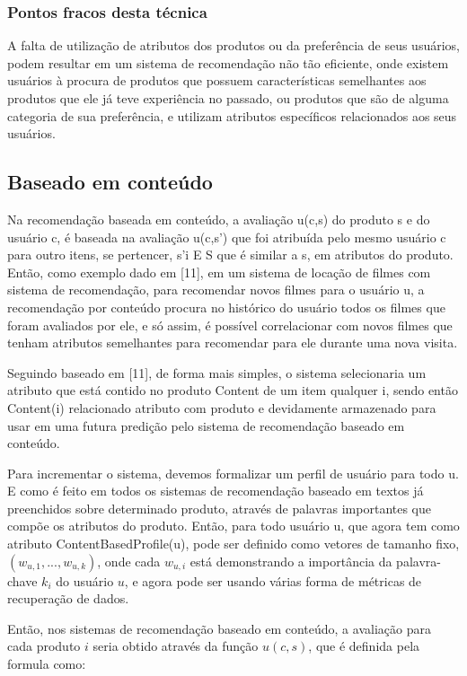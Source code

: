 \documentclass[12pt,
				openright,
				twoside,
				a4paper,
				apter=TITLE,
				section=TITLE,
				subsection=TITLE,
				chapter=TITLE,
				english,
				brazil]{abntex2}
\begin{document}
\subsubsection{Pontos fracos desta técnica}
A falta de utilização de atributos dos produtos ou da preferência de seus usuários, podem resultar em um sistema de recomendação não tão eficiente, onde existem usuários à procura de produtos que possuem características semelhantes aos produtos que ele já teve experiência no passado, ou produtos que são de alguma categoria de sua preferência, e utilizam atributos específicos relacionados aos seus usuários.


\subsection{Baseado em conteúdo}
Na recomendação baseada em conteúdo, a avaliação u(c,s) do produto s e do usuário c, é baseada na avaliação u(c,s') que foi atribuída pelo mesmo usuário c para outro itens, se pertencer, s'i E S que é similar a s, em atributos do produto. Então, como exemplo dado em [11], em um sistema de locação de filmes com sistema de recomendação, para recomendar novos filmes para o usuário u, a recomendação por conteúdo procura no histórico do usuário todos os filmes que foram avaliados por ele, e só assim, é possível correlacionar com novos filmes que tenham atributos semelhantes para recomendar para ele durante uma nova visita.

Seguindo baseado em [11], de forma mais simples, o sistema selecionaria um atributo que está contido no produto Content de um item qualquer i, sendo então Content(i) relacionado atributo com produto e devidamente armazenado para usar em uma futura predição pelo sistema de recomendação baseado em conteúdo.

Para incrementar o sistema, devemos formalizar um perfil de usuário para todo u. E como é feito em todos os sistemas de recomendação baseado em textos já preenchidos sobre determinado produto, através de palavras importantes que compõe os atributos do produto. Então, para todo usuário u, que agora tem como atributo ContentBasedProfile(u), pode ser definido
como vetores de tamanho fixo, $(w_{u,1}, ... , w_{u,k})$, onde cada $w_{u,i}$ está demonstrando a importância da palavra-chave $k_i$ do usuário $u$, e agora pode ser usando várias forma de métricas de recuperação de dados. 

Então, nos sistemas de recomendação baseado em conteúdo, a avaliação para cada produto $i$ seria obtido através da função $u(c,s)$, que é definida pela formula como: 
\end{document}
